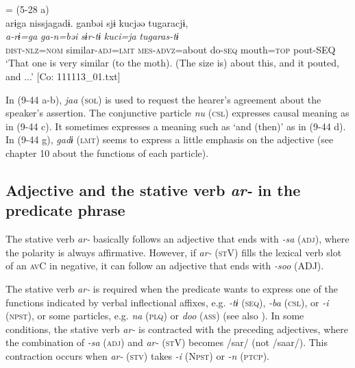 \ex{} = (5-28 a)\\
    \glll  arɨga  nissjagadɨ.  ganbəi  sjɨ  kucjəə  tugaracjɨ,\\
      \textit{a-rɨ=ga}  \textit{}  \textit{ga-n=bəi}  \textit{sɨr-tɨ}   \textit{kuci=ja}  \textit{tugaras-tɨ}\\
      \textsc{dist}-\textsc{nlz}=\textsc{nom}  similar-\textsc{adj}=\textsc{lmt}  \textsc{mes}-\textsc{advz}=about  do-\textsc{seq}  mouth=\textsc{top}  pout-SEQ      \\
      \glt       ‘That one is very similar (to the moth). (The size is) about this, and it pouted, and ...’ [Co: 111113\_01.txt]
    \z
\z

In (9-44 a-b), \textit{jaa} (\textsc{sol}) is used to request the hearer’s agreement about the speaker’s assertion. The conjunctive particle \textit{nu} (\textsc{csl}) expresses causal meaning as in (9-44 c). It sometimes expresses a meaning such as ‘and (then)’ as in (9-44 d). In (9-44 g), \textit{gadɨ} (\textsc{lmt}) seems to express a little emphasis on the adjective (see chapter 10 about the functions of each particle).

\subsection{Adjective and the stative verb \textit{ar-} in the predicate phrase}\label{sec:9.2.2}

The stative verb \textit{ar-} basically follows an adjective that ends with \textit{{}-sa} (\textsc{adj}), where the polarity is always affirmative. However, if \textit{ar-} (\textsc{st}V) fills the lexical verb slot of an \textsc{av}C in negative, it can follow an adjective that ends with \textit{{}-soo} (ADJ).

The stative verb \textit{ar-} is required when the predicate wants to express one of the functions indicated by verbal inflectional affixes, e.g. \textit{{}-tɨ} (\textsc{seq}), \textit{{}-ba} (\textsc{csl}), or \textit{-i} (\textsc{npst}), or some particles, e.g. \textit{na} (\textsc{plq}) or \textit{doo} (\textsc{ass}) (see also ). In some conditions, the stative verb \textit{ar-} is contracted with the preceding adjectives, where the combination of \textit{{}-sa} (\textsc{adj}) and \textit{ar-} (\textsc{st}V) becomes /sar/ (not /saar/). This contraction occurs when \textit{ar-} (\textsc{stv}) takes \textit{{}-i} (N\textsc{pst}) or \textit{{}-n} (\textsc{ptcp}).

